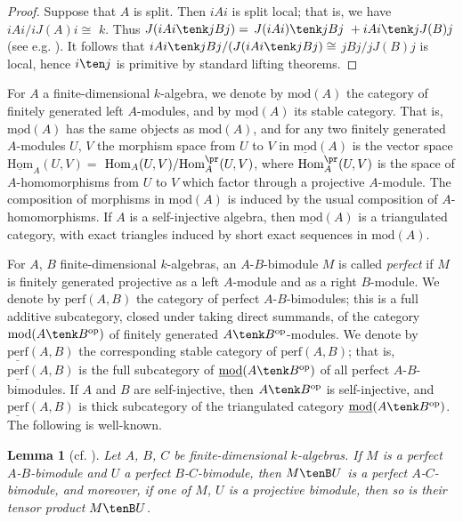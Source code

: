 \documentclass{amsart}
\theoremstyle{plain}\newtheorem{Theorem}{Theorem}[section]
\theoremstyle{plain}\newtheorem{Conjecture}[Theorem]{Conjecture}
\theoremstyle{plain}\newtheorem{Corollary}[Theorem]{Corollary}
\theoremstyle{plain}\newtheorem{Lemma}[Theorem]{Lemma}
\theoremstyle{plain}\newtheorem{Proposition}[Theorem]{Proposition}
\theoremstyle{definition}\newtheorem{Definition}[Theorem]{Definition}
\theoremstyle{definition}\newtheorem{Example}[Theorem]{Example}
\theoremstyle{definition}\newtheorem{Examples}[Theorem]{Examples}
\theoremstyle{definition}\newtheorem{Exercise}[Theorem]{Exercise}
\theoremstyle{definition}\newtheorem{Notation}[Theorem]{Notation}
\theoremstyle{definition}\newtheorem{Remark}[Theorem]{Remark}
\theoremstyle{definition}\newtheorem{Remarks}[Theorem]{Remarks}
\theoremstyle{plain}\newtheorem{Statement}[Theorem]{}
\def\Hom{\mathrm{Hom}}           \def\tenkS{\otimes_{kS}}
\def\Hombar{\underline{\mathrm{Hom}}}
\def\mod{\mathrm{mod}}
\def\modbar{\underline{\mathrm{mod}}}
\def\op{\mathrm{op}}
\def\perf{\mathrm{perf}}
\def\perfbar{\underline{\mathrm{perf}}}
\begin{document}
\begin{proof} 
Suppose that $A$ is split. Then $iAi$ is split local; that is, we have 
$iAi/iJ(A)i\cong$ $k$. Thus $J(iAi\tenk jBj)=$ 
$J(iAi)\tenk jBj \ + iAi\tenk jJ(B)j$ (see e.g.  \cite[Corollary 1.16.15]{LiBookI}). 
It follows that $iAi\tenk jBj / (J(iAi\tenk jBj)\cong$  $ jBj/jJ(B)j$ is local, hence 
$i\ten j$ is primitive by standard lifting theorems.
\end{proof}


For $A$ a finite-dimensional $k$-algebra, we denote by $\mod(A)$ the category 
of finitely generated left $A$-modules, and by $\modbar(A)$ its stable category.
That is, $\modbar(A)$ has the same objects as $\mod(A)$, and for any two
finitely generated $A$-modules $U$, $V$ the morphism space from $U$ to $V$
in $\modbar(A)$ is the vector space $\Hombar_A(U,V)=$ 
$\Hom_A(U,V)/\Hom_A^\pr(U,V)$, where $\Hom_A^\pr(U,V)$  is the space of
$A$-homomorphisms from $U$ to $V$ which factor through a projective $A$-module.
The composition of morphisms in $\modbar(A)$ is induced by the usual composition
of $A$-homomorphisms.
If $A$ is a self-injective algebra, then $\modbar(A)$ is a triangulated category,
with exact triangles induced by short exact sequences in $\mod(A)$. 

For $A$, $B$  finite-dimensional
$k$-algebras,  an $A$-$B$-bimodule $M$ is called {\em perfect} if $M$
is finitely generated projective as a left $A$-module and as a right $B$-module.
We denote by $\perf(A,B)$ the category of perfect $A$-$B$-bimodules; this is a
full additive subcategory, closed under taking direct summands, 
of the category $\mod(A\tenk B^\op)$ of
finitely generated $A\tenk B^\op$-modules. We denote by $\perfbar(A,B)$ the
corresponding stable category of $\perf(A,B)$; that is, $\perfbar(A,B)$ is the
full subcategory of $\modbar(A\tenk B^\op)$ of all perfect $A$-$B$-bimodules.
If $A$ and $B$ are self-injective, then $A\tenk B^\op$ is self-injective, and
$\perfbar(A,B)$ is thick subcategory
of the triangulated category $\modbar(A\tenk B^\op)$.
The following is well-known.


\begin{Lemma}[{cf. \cite[Propositions 9.1.1, 9.1.2]{LiBookII}}] \label{perf-Lemma}
Let $A$, $B$, $C$  be finite-dimensional $k$-algebras.  
If $M$ is a perfect $A$-$B$-bimodule and $U$ a perfect $B$-$C$-bimodule, 
then $M\tenB U$ is a perfect $A$-$C$-bimodule, and moreover,  if one of  
$M$, $U$ is a projective bimodule, then so is their tensor product  $M\tenB U$.
\end{Lemma} 
\end{document}
